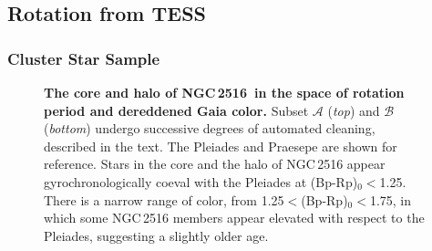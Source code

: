\documentclass[12pt,twocolumn,tighten]{aastex63}
\newcommand{\cn}{NGC\,2516} %
\begin{document}
\subsection{Rotation from TESS}
\label{subsec:tess}

\subsubsection{Cluster Star Sample}

\begin{figure}[t]
	\begin{center}
		\leavevmode
	\end{center}
	\vspace{-0.7cm}
  \caption{ {\bf The core and halo of \cn\ in the space of rotation
    period and dereddened Gaia color.}
    Subset $\mathcal{A}$ ({\it top}) and $\mathcal{B}$ ({\it bottom})
    undergo successive degrees of automated cleaning, described in the
    text.
    The Pleiades \citep[125\,Myr][]{rebull_rotation_2016a} and
    Praesepe \citep[650\,Myr][]{douglas_poking_2017} are shown for
    reference.
    Stars in the core and the halo of NGC\,2516 appear
    gyrochronologically coeval with the Pleiades at (Bp-Rp)$_0$$<$1.25.
    There is a narrow range of color, from 1.25$<$(Bp-Rp)$_0$$<$1.75,
    in which some NGC\,2516 members appear elevated with respect to
    the Pleiades, suggesting a slightly older age.
		\label{fig:rot}
	}
\end{figure}
\end{document}
